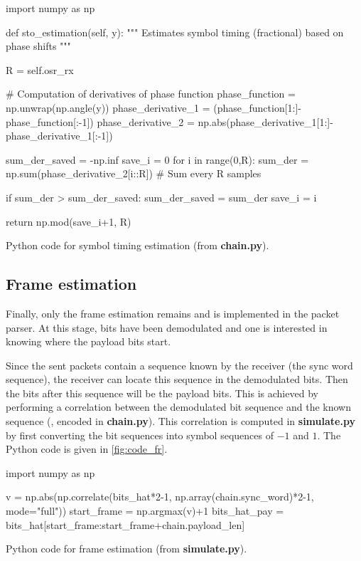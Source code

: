 \begin{listing}[H]
\begin{python}
import numpy as np

def sto_estimation(self, y):
    """
    Estimates symbol timing (fractional) based on phase shifts
    """

    R = self.osr_rx

    # Computation of derivatives of phase function
    phase_function = np.unwrap(np.angle(y))
    phase_derivative_1 = (phase_function[1:]-phase_function[:-1])
    phase_derivative_2 = np.abs(phase_derivative_1[1:]-phase_derivative_1[:-1])

    sum_der_saved = -np.inf
    save_i = 0
    for i in range(0,R):
        sum_der = np.sum(phase_derivative_2[i::R]) # Sum every R samples

        if sum_der > sum_der_saved:
            sum_der_saved = sum_der
            save_i = i

    return np.mod(save_i+1, R)

\end{python}
\caption{Python code for symbol timing estimation (from \textbf{chain.py}).}
\label{fig:code_symb}
\end{listing}


\subsection{Frame estimation}
Finally, only the frame estimation remains and is implemented in the packet parser. At this stage, bits have been demodulated and one is interested in knowing where the payload bits start.

Since the sent packets contain a sequence known by the receiver (the sync word sequence), the receiver can locate this sequence in the demodulated bits. Then the bits after this sequence will be the payload bits. This is achieved by performing a correlation between the demodulated bit sequence and the known sequence (, encoded in \textbf{chain.py}). This correlation is computed in \textbf{simulate.py} by first converting the bit sequences into symbol sequences of $-1$ and $1$. The Python code is given in \autoref{fig:code_fr}.
\begin{listing}[H]
\begin{python}
import numpy as np

v = np.abs(np.correlate(bits_hat*2-1, np.array(chain.sync_word)*2-1, mode="full"))
start_frame = np.argmax(v)+1
bits_hat_pay = bits_hat[start_frame:start_frame+chain.payload_len]

\end{python}
\caption{Python code for frame estimation (from \textbf{simulate.py}).}
\label{fig:code_fr}
\end{listing}

